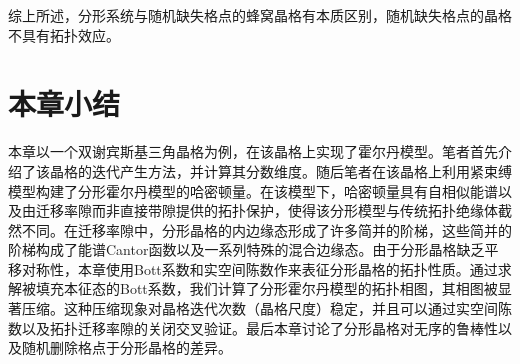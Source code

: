 综上所述，分形系统与随机缺失格点的蜂窝晶格有本质区别，随机缺失格点的晶格不具有拓扑效应。

\section{本章小结}
本章以一个双谢宾斯基三角晶格为例，在该晶格上实现了霍尔丹模型。笔者首先介绍了该晶格的迭代产生方法，并计算其分数维度。随后笔者在该晶格上利用紧束缚模型构建了分形霍尔丹模型的哈密顿量。在该模型下，哈密顿量具有自相似能谱以及由迁移率隙而非直接带隙提供的拓扑保护，使得该分形模型与传统拓扑绝缘体截然不同。在迁移率隙中，分形晶格的内边缘态形成了许多简并的阶梯，这些简并的阶梯构成了能谱Cantor函数以及一系列特殊的混合边缘态。由于分形晶格缺乏平移对称性，本章使用Bott系数和实空间陈数作来表征分形晶格的拓扑性质。通过求解被填充本征态的Bott系数，我们计算了分形霍尔丹模型的拓扑相图，其相图被显著压缩。这种压缩现象对晶格迭代次数（晶格尺度）稳定，并且可以通过实空间陈数以及拓扑迁移率隙的关闭交叉验证。最后本章讨论了分形晶格对无序的鲁棒性以及随机删除格点于分形晶格的差异。